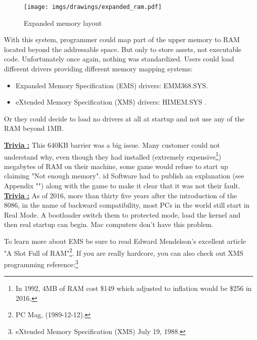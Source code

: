 \documentclass[book.tex]{subfiles}
\begin{document}
\begin{figure}[H]
\centering
\texttt{[image: imgs/drawings/expanded\_ram.pdf]}
\caption{Expanded memory layout}
\label{fig:ems_xms_layout}
\end{figure}
With this system, programmer could map part of the upper memory to RAM located beyond the addressable space. But only to store assets, not executable code. 
Unfortunately once again, nothing was standardized. Users could load different drivers providing different memory mapping systems:
\begin{itemize}
\item Expanded Memory Specification (EMS) drivers: EMM368.SYS.
\item eXtended Memory Specification (XMS) drivers: HIMEM.SYS .
\end{itemize}

Or they could decide to load no drivers at all at startup and not use any of the RAM beyond 1MB.\\
\par
\textbf{\underline{Trivia :}}  This 640KB barrier was a big issue. Many customer could not understand why, even though they had installed (extremely expensive\footnote{In 1992, 4MB of RAM cost \$149 which adjusted to inflation would be \$256 in 2016.}) megabytes of RAM on their machine, some game would refuse to start up claiming "Not enough memory". id Software had to publish an explanation (see Appendix "") along with the game to make it clear that it was not their fault.\\

\textbf{\underline{Trivia :}}  As of 2016, more than thirty five years after the introduction of the 8086, in the name of backward compatibility, most PCs in the world still start in Real Mode. A bootloader switch them to protected mode, load the kernel and then real startup can begin. Mac computers don't have this problem.

\bigskip
To learn more about EMS be sure to read Edward Mendelson's excellent article "A Slot Full of RAM"\footnote{PC Mag, (1989-12-12).}. If you are really hardcore, you can also check out XMS programming reference:\footnote{eXtended Memory Specification (XMS) July 19, 1988.}\\
\par
\end{document}
